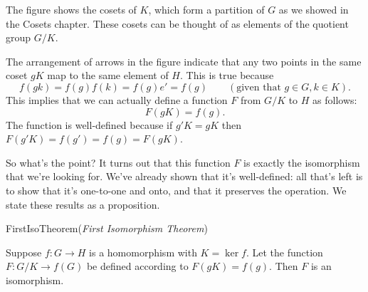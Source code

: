 The figure shows the cosets of $K$, which form a partition of $G$ as we showed in the Cosets chapter. These cosets can be thought of as elements of the quotient group $G/K$. 

The arrangement of arrows in the figure indicate that any two points in the same coset $gK$ map to the same element of $H$.  
This is true because
\[ f(gk) = f(g)f(k) = f(g)e' = f(g)\qquad (\text{given that } g \in G, k \in K).\]
This implies that we can actually define a function $F$ from $G/K$ to $H$ as follows:
\[ F(gK) = f(g). \]
The function is well-defined because if $g'K = gK$ then $F(g'K) = f(g') = f(g) = F(gK)$.
 
So what's the point? It turns out that this function $F$ is exactly the isomorphism that we're looking for. We've already shown that it's well-defined: all that's left is to show that it's one-to-one and onto, and that it preserves the operation. We state these results as a proposition.

%  
%
%
%
%
% 
  
\begin{prop}{FirstIsoTheorem}(\emph{First Isomorphism Theorem})

Suppose $f : G \rightarrow H$ is a homomorphism with $K =\ker
f$. Let the function $F: G/K \rightarrow f(G)$
 be defined according to $F(gK) = f(g)$. Then $F$ is an isomorphism. 
\end{prop}
 
